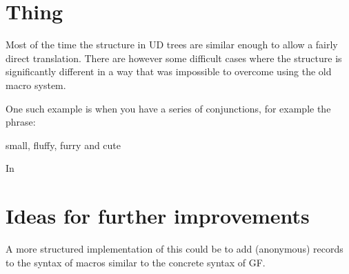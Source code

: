 \section{Thing}

Most of the time the structure in UD trees are similar enough to allow a fairly direct translation.
There are however some difficult cases where the structure is significantly different in a way that was impossible to overcome using the old macro system.

One such example is when you have a series of conjunctions, for example the phrase:

  small, fluffy, furry and cute

In 

\section{Ideas for further improvements}

A more structured implementation of this could be to add (anonymous) records to the syntax of macros similar to the concrete syntax of GF. 
